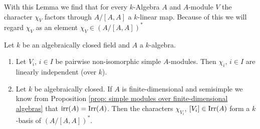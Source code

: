 With this Lemma we find that for every $k$-Algebra $A$ and $A$-module $V$ the character $\chi_V$ factors through $A/[A,A]$ a $k$-linear map. Because of this we will regard $\chi_V$ as an element $\chi_V \in (A/[A,A])^*$


\begin{thrm}
 Let $k$ be an algebraically closed field and $A$ a $k$-algebra.
 \begin{enumerate}[label=\emph{\alph*})]
  \item
   Let $V_i$, $i \in I$ be pairwise non-isomorphic simple $A$-modules. Then $\chi_i$, $i \in I$ are linearly independent (over $k$).
  \item
   Let $k$ be algebraically closed. If $A$ is finite-dimensional and semisimple we know from Proposition \ref{prop: simple modules over finite-dimensional algebras} that $\operatorname{irr}(A) = \operatorname{Irr}(A)$. Then the characters $\chi_{V_i}$, $[V_i] \in \operatorname{Irr}(A)$ form a $k$-basis of $(A/[A,A])^*$.
 \end{enumerate}
\end{thrm}
